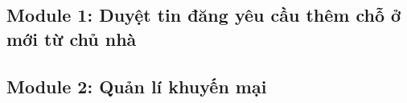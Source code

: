 \subsection{Module 1: Duyệt tin đăng yêu cầu thêm chỗ ở mới từ chủ nhà}

\newpage
\subsection{Module 2: Quản lí khuyến mại}
